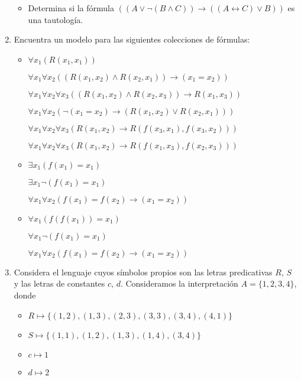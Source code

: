 \documentclass[11pt,answers]{exam}
\begin{document}
\begin{enumerate}
\begin{itemize}
        \item Determina si la fórmula $((A \lor \neg (B \land C)) \to ((A \leftrightarrow C) \lor B))$ es una tautología.
    \end{itemize}
    

    \item Encuentra un modelo para las siguientes colecciones de fórmulas:
    \begin{itemize}
        \item $\forall x_1 (R(x_1, x_1))$
        
        $\forall x_1 \forall x_2 ((R(x_1, x_2) \land R(x_2, x_1)) \to (x_1 = x_2))$
        
        $\forall x_1 \forall x_2 \forall x_3 ((R(x_1, x_2) \land R(x_2, x_3)) \to R(x_1, x_3))$
        
        $\forall x_1 \forall x_2 (\neg (x_1 = x_2) \to (R(x_1, x_2) \lor R(x_2, x_1)))$
        
        $\forall x_1 \forall x_2 \forall x_3 (R(x_1, x_2) \to R(f(x_3, x_1), f(x_3, x_2)))$
        
        $\forall x_1 \forall x_2 \forall x_3 (R(x_1, x_2) \to R(f(x_1, x_3), f(x_2, x_3)))$
        
        \item $\exists x_1 (f(x_1) = x_1)$
        
        $\exists x_1 \neg (f(x_1) = x_1)$
        
        $\forall x_1 \forall x_2 (f(x_1) = f(x_2) \to (x_1 = x_2))$
        
        \item $\forall x_1 (f(f(x_1)) = x_1)$
        
        $\forall x_1 \neg (f(x_1) = x_1)$
        
        $\forall x_1 \forall x_2 (f(x_1) = f(x_2) \to (x_1 = x_2))$
    \end{itemize}
    

    \item Considera el lenguaje cuyos símbolos propios son las letras predicativas $R$, $S$ y las letras de constantes $c$, $d$. Consideramos la interpretación $A = \{1, 2, 3, 4\}$, donde
    \begin{itemize}
        \item $R \mapsto \{(1, 2), (1, 3), (2, 3), (3, 3), (3, 4), (4, 1)\}$
        \item $S \mapsto \{(1, 1), (1, 2), (1, 3), (1, 4), (3, 4)\}$
        \item $c \mapsto 1$
        \item $d \mapsto 2$
    \end{itemize}
    

\end{enumerate}
\end{document}
